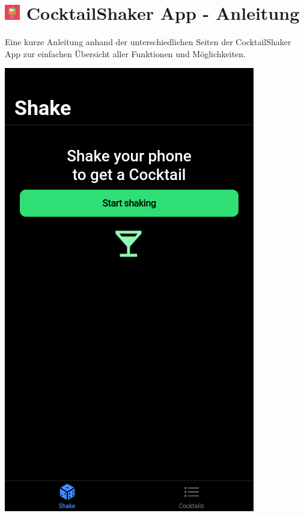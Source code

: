 \documentclass[a4paper, 10pt]{article}
\begin{document}
\section*{\centering \includegraphics[width=25px]{icon.png} CocktailShaker App - Anleitung}

\vspace{\baselineskip}

Eine kurze Anleitung anhand der unterschiedlichen Seiten der CocktailShaker App zur einfachen Übersicht aller Funktionen und Möglichkeiten.

\bigskip

\begin{multicols}{4}
    \begin{center}
        \includegraphics[width=.8\linewidth]{Start.png}
    \end{center}
    \columnbreak

\end{multicols}
\end{document}
